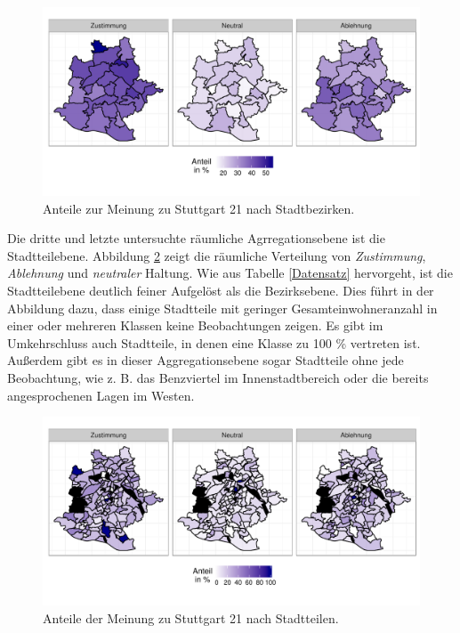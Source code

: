 \documentclass{Vorlage}
\begin{document}
\begin{figure}[h]
 \begin{center}
 \includegraphics[scale=0.8]{Pictures/BStuttgart3}
 \caption{Anteile zur Meinung zu Stuttgart 21 nach Stadtbezirken.}
 \label{BStuttgart21}
 \end{center}
\end{figure}

Die dritte und letzte untersuchte räumliche Agrregationsebene ist die Stadtteilebene. Abbildung \ref{SStuttgart21} 
zeigt die räumliche Verteilung von \textit{Zustimmung}, \textit{Ablehnung} und \textit{neutraler} Haltung. Wie aus 
Tabelle \ref{Datensatz} hervorgeht, ist die Stadtteilebene deutlich feiner Aufgelöst als die Bezirksebene. Dies führt in 
der Abbildung dazu, dass einige Stadtteile mit geringer Gesamteinwohneranzahl in einer oder mehreren Klassen keine 
Beobachtungen zeigen. Es gibt im Umkehrschluss auch Stadtteile, in denen eine Klasse zu 100 \% vertreten ist. 
Außerdem gibt es in dieser Aggregationsebene sogar Stadtteile ohne jede Beobachtung, wie z. B. das Benzviertel im 
Innenstadtbereich oder die bereits angesprochenen Lagen im Westen.

\begin{figure}[h]
 \begin{center}
 \includegraphics[scale=0.8]{Pictures/SStuttgart3}
 \caption{Anteile der Meinung zu Stuttgart 21 nach Stadtteilen.}
 \label{SStuttgart21}
 \end{center}
\end{figure}
\end{document}
